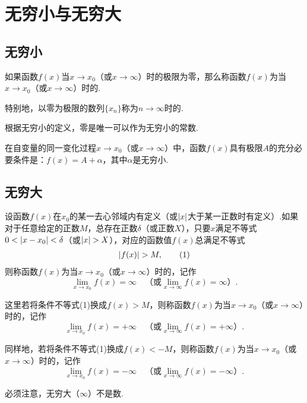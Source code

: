 \section{无穷小与无穷大}
\subsection{无穷小}
\begin{definition}
如果函数\(f(x)\)当\(x \to x_0\)（或\(x \to \infty\)）时的极限为零，那么称函数\(f(x)\)为当\(x \to x_0\)（或\(x \to \infty\)）时的.

特别地，以零为极限的数列\(\{x_n\}\)称为\(n \to \infty\)时的.
\end{definition}

根据无穷小的定义，零是唯一可以作为无穷小的常数.

\begin{theorem}
在自变量的同一变化过程\(x \to x_0\)（或\(x \to \infty\)）中，函数\(f(x)\)具有极限\(A\)的充分必要条件是：\(f(x) = A + \alpha\)，其中\(\alpha\)是无穷小.
\end{theorem}

\subsection{无穷大}
\begin{definition}
设函数\(f(x)\)在\(x_0\)的某一去心邻域内有定义（或\(\abs{x}\)大于某一正数时有定义）.如果对于任意给定的正数\(M\)，总存在正数\(\delta\)（或正数\(X\)），只要\(x\)满足不等式\(0 < \abs{x - x_0} < \delta\)（或\(\abs{x} > X\)），对应的函数值\(f(x)\)总满足不等式\begin{gather}
\abs{f(x)} > M, \tag1
\end{gather}则称函数\(f(x)\)为当\(x \to x_0\)（或\(x \to \infty\)）时的，记作\[
\lim_{x \to x_0}f(x) = \infty
\quad\text{（或} \lim_{x \to \infty}f(x) = \infty \text{）}.
\]

这里若将条件不等式(1)换成\(f(x) > M\)，则称函数\(f(x)\)为当\(x \to x_0\)（或\(x \to \infty\)）时的，记作\[
\lim_{x \to x_0}f(x) = +\infty
\quad\text{（或} \lim_{x \to \infty}f(x) = +\infty \text{）}.
\]

同样地，若将条件不等式(1)换成\(f(x) < -M\)，则称函数\(f(x)\)为当\(x \to x_0\)（或\(x \to \infty\)）时的，记作\[
\lim_{x \to x_0}f(x) = -\infty
\quad\text{（或} \lim_{x \to \infty}f(x) = -\infty \text{）}.
\]
\end{definition}
必须注意，无穷大（\(\infty\)）不是数.

